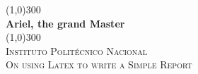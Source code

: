 \documentclass{article}
\begin{document}
\begin{titlepage}
	\begin{center}
	\line(1,0){300} \\
	[0.25in]
	\huge{\bfseries Ariel, the grand Master} \\
	[0.25in]
	\line(1,0){300} \\
	[1.5cm]
	\textsc{\LARGE Instituto Polit\'{e}cnico Nacional}\\
	[0.75cm]
	\textsc{\Large On using Latex to write a Simple Report}\\
	
	\end{center}
\end{titlepage}
\end{document}
